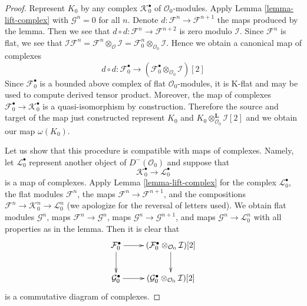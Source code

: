 \begin{proof}
Represent $K_0$ by any complex
$\mathcal{K}_0^\bullet$ of $\mathcal{O}_0$-modules.
Apply Lemma \ref{lemma-lift-complex}
with $\mathcal{G}^n = 0$ for all $n$.
Denote $d : \mathcal{F}^n \to \mathcal{F}^{n + 1}$
the maps produced by the lemma. Then we see that
$d \circ d : \mathcal{F}^n \to \mathcal{F}^{n + 2}$
is zero modulo $\mathcal{I}$. Since $\mathcal{F}^n$ is flat,
we see that
$\mathcal{I}\mathcal{F}^n =
\mathcal{F}^n \otimes_{\mathcal{O}} \mathcal{I} =
\mathcal{F}^n_0 \otimes_{\mathcal{O}_0} \mathcal{I}$.
Hence we obtain a canonical map of complexes
$$
d \circ d : \mathcal{F}_0^\bullet
\longrightarrow
(\mathcal{F}_0^\bullet \otimes_{\mathcal{O}_0} \mathcal{I})[2]
$$
Since $\mathcal{F}_0^\bullet$ is a bounded above complex
of flat $\mathcal{O}_0$-modules, it is K-flat and may be used
to compute derived tensor product. Moreover, the map of
complexes $\mathcal{F}_0^\bullet \to \mathcal{K}_0^\bullet$
is a quasi-isomorphism by construction. Therefore the source and
target of the map just constructed represent $K_0$ and
$K_0 \otimes_{\mathcal{O}_0}^\mathbf{L} \mathcal{I}[2]$
and we obtain our map $\omega(K_0)$.

\medskip\noindent
Let us show that this procedure is compatible with maps of complexes.
Namely, let $\mathcal{L}_0^\bullet$ represent another object of
$D^-(\mathcal{O}_0)$ and suppose that
$$
\mathcal{K}_0^\bullet \longrightarrow \mathcal{L}_0^\bullet
$$
is a map of complexes. Apply Lemma \ref{lemma-lift-complex}
for the complex $\mathcal{L}_0^\bullet$, the flat modules
$\mathcal{F}^n$, the maps $\mathcal{F}^n \to \mathcal{F}^{n + 1}$,
and the compositions
$\mathcal{F}^n \to \mathcal{K}_0^n \to \mathcal{L}_0^n$
(we apologize for the reversal of letters used).
We obtain flat modules $\mathcal{G}^n$, maps
$\mathcal{F}^n \to \mathcal{G}^n$, maps
$\mathcal{G}^n \to \mathcal{G}^{n + 1}$, and maps
$\mathcal{G}^n \to \mathcal{L}_0^n$ with all properties
as in the lemma. Then it is clear that
$$
\xymatrix{
\mathcal{F}_0^\bullet \ar[d] \ar[r] &
(\mathcal{F}_0^\bullet \otimes_{\mathcal{O}_0} \mathcal{I})[2] \ar[d] \\
\mathcal{G}_0^\bullet \ar[r] &
(\mathcal{G}_0^\bullet \otimes_{\mathcal{O}_0} \mathcal{I})[2]
}
$$
is a commutative diagram of complexes.


\end{proof}
